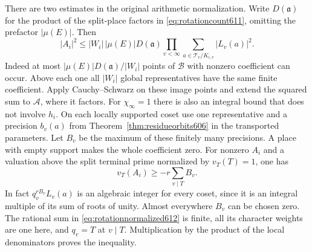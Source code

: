 \documentclass[a4paper,11pt]{article}
\theoremstyle{definition}
\theoremstyle{remark}
\numberwithin{equation}{section}
\begin{document}
There are two estimates in the original arithmetic normalization.
Write \(D(\mathfrak a)\) for the product of the split-place factors
in \eqref{eq:rotationcount611}, omitting the prefactor \(|\mu(E)|\).
Then
\[
 |A_i|^2\le |W_i|\,|\mu(E)|D(\mathfrak a)
              \prod_{v<\infty}\sum_{a\in\mathcal T_v/K_{i,v}}
                                                  |L_v(a)|^2.
\]
Indeed at most \(|\mu(E)|D(\mathfrak a)/|W_i|\) points of
\(\mathcal B\) with nonzero coefficient can occur. Above each
one all \(|W_i|\) global representatives have the same finite
coefficient. Apply Cauchy--Schwarz on these image points and
extend the squared sum to \(\mathcal A\), where it factors.
For \(\chi_\infty=1\) there is also an integral bound that does
not involve \(h_i\). On each locally supported coset use one
representative and a precision \(b_v(a)\) from
Theorem~\ref{thm:residueorbits606} in the transported parameters.
Let \(B_v\) be the maximum of these finitely many precisions.
A place with empty support makes the whole coefficient zero.
For nonzero \(A_i\) and a valuation above the split terminal
prime normalized by \(v_T(T)=1\), one has
\[
                        v_T(A_i)\ge -r\sum_{v\mid T}B_v .
\]
In fact \(q_v^{rB_v}L_v(a)\) is an algebraic integer for every
coset, since it is an integral multiple of its sum of roots of
unity. Almost everywhere \(B_v\) can be chosen zero. The rational
sum in \eqref{eq:rotationnormalized612} is finite, all its character
weights are one here, and \(q_v=T\) at \(v\mid T\). Multiplication
by the product of the local denominators proves the inequality.
\end{document}

